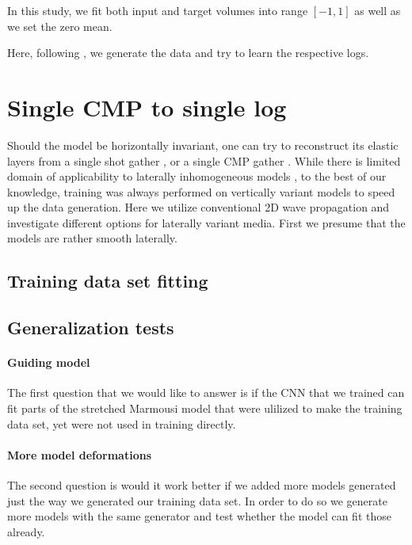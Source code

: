 \documentclass[manuscript]{geophysics}
\begin{document}
In this study, we fit both input and target volumes into range $[-1, 1]$ as well as we set the zero mean.

%






Here, following \citep{york2019}, we generate the data and try to learn the respective logs.



\section{Single CMP to single log}
Should the model be horizontally invariant, one can try to reconstruct its elastic layers from a single shot gather \citep{roth1994}, or a single CMP gather \citep{york2019}.
While there is limited domain of applicability to laterally inhomogeneous models \citep{york2019}, to the best of our knowledge, training was always performed on vertically variant models to speed up the data generation. Here we utilize conventional 2D wave propagation and investigate different options for laterally variant media. First we presume that the models are rather smooth laterally.
\subsection{Training data set fitting}


\subsection{Generalization tests}

\paragraph{Guiding model}
The first question that we would like to answer is if the CNN that we trained can fit parts of the stretched Marmousi model that were ulilized to make the training data set, yet were not used in training directly.


\paragraph{More model deformations}
The second question is would it work better if we added more models generated just the way we generated our training data set. In order to do so we generate more models with the same generator and test whether the model can fit those already.
\end{document}
